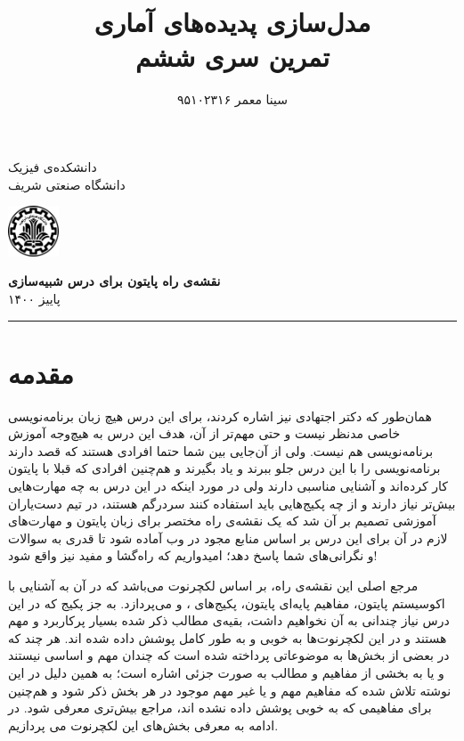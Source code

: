 \documentclass[11pt, a4paper]{article}
\title{\textbf{مدل‌سازی پدیده‌های آماری}\\تمرین سری ششم}
\author{سینا معمر ۹۵۱۰۲۳۱۶}
\begin{document}
\pagestyle{plain}
\begin{flushright}
  دانشکده‌ی فیزیک\\
  دانشگاه صنعتی شریف
\end{flushright}

\begin{flushleft}\vspace{-1.8cm}
  \includegraphics[height=1.5cm]{sharif_logo.png}
\end{flushleft}
 
\begin{center}\vspace{0cm}
  \textbf{\large نقشه‌ی راه پایتون برای درس شبیه‌سازی}\\
  \vspace{3mm}
  پاییز ۱۴۰۰\\
\end{center}
\rule{\linewidth}{0.1mm}


\section{مقدمه}
همان‌طور که دکتر اجتهادی نیز اشاره کردند،
برای این درس هیچ زبان‌ برنامه‌نویسی خاصی مدنظر نیست و حتی مهم‌تر از آن،
هدف این درس به هیچ‌وجه آموزش برنامه‌نویسی هم نیست.
ولی از آن‌جایی بین شما حتما افرادی هستند که قصد دارند برنامه‌نویسی را با این درس جلو ببرند و یاد بگیرند
و هم‌چنین افرادی که قبلا با پایتون کار کرده‌اند و آشنایی مناسبی دارند ولی در مورد اینکه در این درس به چه مهارت‌هایی بیش‌تر نیاز دارند
و از چه پکیج‌هایی باید استفاده کنند سردرگم هستند،
در تیم دست‌یاران آموزشی تصمیم بر آن شد که یک نقشه‌ی راه مختصر برای زبان پایتون و مهارت‌های لازم در آن برای این درس بر اساس
منابع مجود در وب آماده شود تا قدری به سوالات و نگرانی‌های شما پاسخ دهد؛
امیدواریم که راه‌گشا و مفید نیز واقع شود!

مرجع اصلی این نقشه‌ی راه،
بر اساس لکچرنوت
\href{https://scipy-lectures.org/intro/}{}
می‌باشد که در آن به آشنایی با اکوسیستم پایتون، مفاهیم پایه‌ای پایتون، پکیج‌های
،
و
می‌پردازد.
به جز پکیج
که در این درس نیاز چندانی به آن نخواهیم داشت،
بقیه‌ی مطالب ذکر شده بسیار پرکاربرد و مهم هستند و در این لکچرنوت‌ها به خوبی و به طور کامل پوشش داده شده اند.
هر چند که در بعضی از بخش‌ها به موضوعاتی پرداخته شده است که چندان مهم و اساسی نیستند و یا به بخشی از مفاهیم و مطالب
به صورت جزئی اشاره است؛
به همین دلیل در این نوشته تلاش شده که مفاهیم مهم و یا غیر مهم موجود در هر بخش ذکر شود
و هم‌چنین برای مفاهیمی که به خوبی پوشش داده نشده اند،
مراجع بیش‌تری معرفی شود.
در ادامه به معرفی بخش‌های این لکچرنوت می پردازیم.
\end{document}
